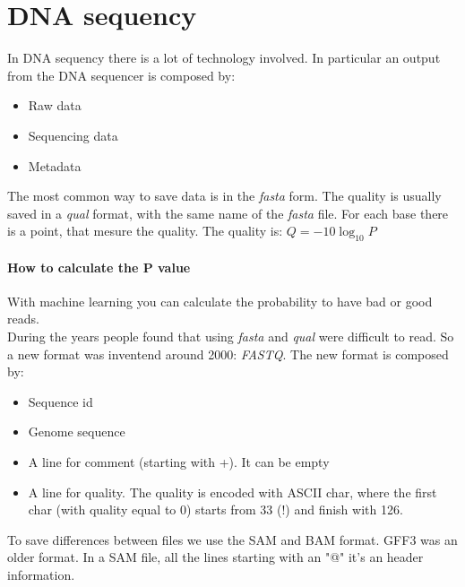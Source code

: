 \section{DNA sequency}
In DNA sequency there is a lot of technology involved. In particular an output
from the DNA sequencer is composed by:
\begin{itemize}
  \item Raw data
  \item Sequencing data
  \item Metadata
\end{itemize}

The most common way to save data is in the \textit{fasta} form. The quality is
usually saved in a \textit{qual} format, with the same name of the
\textit{fasta} file. For each base there is a point, that mesure the quality.
The quality is: $Q=-10\log_{10}P$

\paragraph*{How to calculate the P value} With machine learning you can
calculate the probability to have bad or good reads. \\


During the years people found that using \textit{fasta} and \textit{qual} were
difficult to read. So a new format was inventend around 2000: \textit{FASTQ}.
The new format is composed by:
\begin{itemize}
  \item Sequence id
  \item Genome sequence
  \item A line for comment (starting with +). It can be empty
  \item A line for quality. The quality is encoded with ASCII char, where the
first char (with quality equal to 0) starts from 33 (!) and finish with 126.
\end{itemize}

To save differences between files we use the SAM and BAM format. GFF3 was an
older format. In a SAM file, all the lines starting with an "@" it's an header
information.
